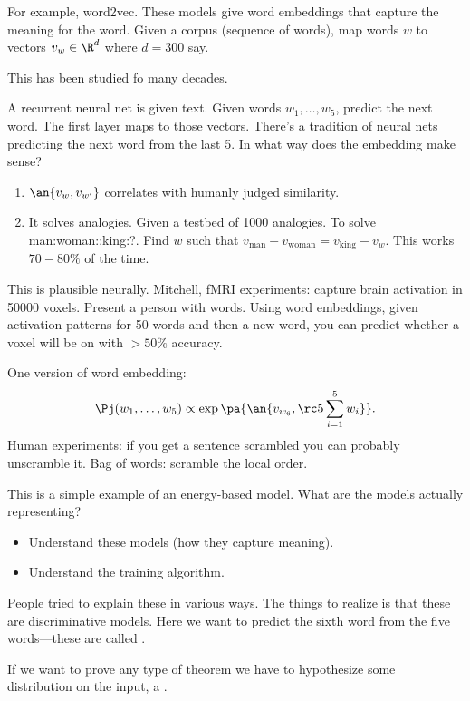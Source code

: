 For example, word2vec. These models give word embeddings that capture the meaning for the word. Given a corpus (sequence of words), map words $w$ to vectors $v_w\in \R^d$ where $d=300$ say. 

This has been studied fo many decades. %

A recurrent neural net is given text. Given words $w_1,\ldots, w_5$, predict the next word. The first layer maps to those vectors. There's a tradition of neural nets predicting the next word from the last 5. 
In what way does the embedding make sense?
\begin{enumerate}
\item
$\an{v_w,v_{w'}}$ correlates with humanly judged similarity.
\item
It solves analogies. Given a testbed of 1000 analogies. To solve man:woman::king:?. Find $w$ such that $v_{\text{man}}-v_{\text{woman}}=v_{\text{king}}-v_w$. This works $70-80\%$ of the time. 
\end{enumerate} 
This is plausible neurally. Mitchell, fMRI experiments: capture brain activation in 50000 voxels. Present a person with words. Using word embeddings, given activation patterns for 50 words and then a new word, you can predict whether a voxel will be on with $>50\%$ accuracy.

One version of word embedding:
\[
\Pj(w_1,\ldots, w_5) \propto \exp\pa{\an{v_{w_6}, \rc5 \sum_{i=1}^5 w_i}}.
\]
Human experiments: if you get a sentence scrambled you can probably unscramble it. Bag of words: scramble the local order.

This is a simple example of an energy-based model. 
What are the models actually representing? 
\begin{itemize}
\item
Understand these models (how they capture meaning).
\item
Understand the training algorithm.
\end{itemize}

People tried to explain these in various ways. The things to realize is that these are discriminative models. Here we want to predict the sixth word from the five words---these are called .

If we want to prove any type of theorem we have to hypothesize some distribution on the input, a .

